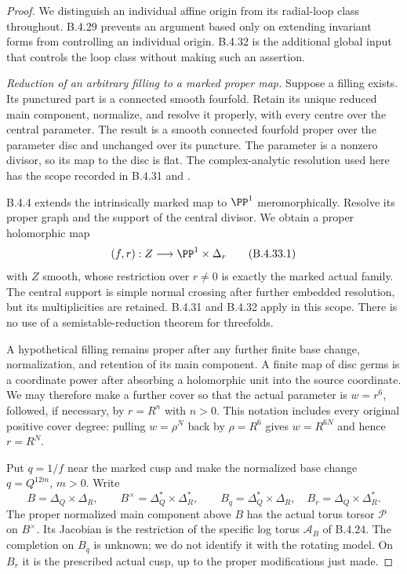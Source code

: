 \begin{proof}
We distinguish an individual affine origin from its
radial-loop class throughout. B.4.29 prevents an
argument based only on extending invariant forms
from controlling an individual origin. B.4.32 is
the additional global input that controls the loop
class without making such an assertion.

\emph{Reduction of an arbitrary filling to a marked proper map.}
Suppose a filling exists. Its punctured part is a
connected smooth fourfold. Retain its unique reduced
main component, normalize, and resolve it properly,
with every centre over the central parameter. The
result is a smooth connected fourfold proper over
the parameter disc and unchanged over its puncture.
The parameter is a nonzero divisor, so its map to
the disc is flat. The complex-analytic resolution
used here has the scope recorded in B.4.31 and
\citet[Theorems 1.6 and 1.10]{BM95AB}.

B.4.4 extends the intrinsically marked map to
$\PP^1$ meromorphically. Resolve its proper graph
and the support of the central divisor. We obtain
a proper holomorphic map
\[
 (f,r):Z\longrightarrow\PP^1\times\Delta_r
 \tag{B.4.33.1}
\]
with $Z$ smooth, whose restriction over $r\ne0$
is exactly the marked actual family. The central
support is simple normal crossing after further
embedded resolution, but its multiplicities are
retained. B.4.31 and B.4.32 apply in this scope.
There is no use of a semistable-reduction theorem
for threefolds.

A hypothetical filling remains proper after any
further finite base change, normalization, and
retention of its main component. A finite map of
disc germs is a coordinate power after absorbing
a holomorphic unit into the source coordinate.
We may therefore make a further cover so that
the actual parameter is $w=r^6$, followed, if
necessary, by $r=R^n$ with $n>0$. This notation
includes every original positive cover degree:
pulling $w=\rho^N$ back by $\rho=R^6$ gives
$w=R^{6N}$ and hence $r=R^N$.

Put $q=1/f$ near the marked cusp and make the
normalized base change $q=Q^{12m}$, $m>0$.
Write
\[
 B=\Delta_Q\times\Delta_R,\qquad
 B^\times=\Delta_Q^*\times\Delta_R^*,\qquad
 B_q=\Delta_Q^*\times\Delta_R,\quad
 B_r=\Delta_Q\times\Delta_R^*.
 \tag{B.4.33.2}
\]
The proper normalized main component above $B$
has the actual torus torsor $\mathscr P$ on
$B^\times$. Its Jacobian is the restriction of
the specific log torus $\mathcal A_B$ of
B.4.24. The completion on $B_q$ is unknown;
we do not identify it with the rotating model.
On $B_r$ it is the prescribed actual cusp,
up to the proper modifications just made.


\end{proof}
